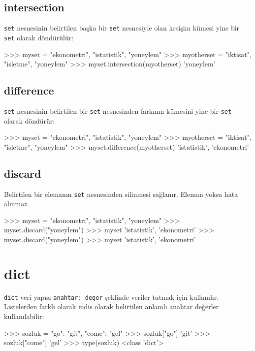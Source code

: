 \documentclass[12pt]{report}
\begin{document}
\subsection{intersection}
\texttt{set} nesnesinin belirtilen başka bir \texttt{set} nesnesiyle olan kesişim kümesi yine bir \texttt{set} olarak döndürülür:

\begin{python}
>>> myset = {"ekonometri", "istatistik", "yoneylem"}
>>> myotherset = {"iktisat", "isletme", "yoneylem"}
>>> myset.intersection(myotherset)
{'yoneylem'}
\end{python}


\subsection{difference}
\texttt{set} nesnesinin belirtilen bir \texttt{set} nesnesinden farkının kümesini yine bir \texttt{set} olarak döndürür:

\begin{python}
>>> myset = {"ekonometri", "istatistik", "yoneylem"}
>>> myotherset = {"iktisat", "isletme", "yoneylem"}
>>> myset.difference(myotherset)
{'istatistik', 'ekonometri'}
\end{python}

\subsection{discard}
Belirtilen bir elemanın \texttt{set} nesnesinden silinmesi sağlanır. Eleman yoksa hata alınmaz.

\begin{python}
>>> myset = {"ekonometri", "istatistik", "yoneylem"}
>>> myset.discard("yoneylem")
>>> myset
{'istatistik', 'ekonometri'}
>>> myset.discard("yoneylem")
>>> myset
{'istatistik', 'ekonometri'}
\end{python}



\section{dict}
\texttt{dict} veri yapısı \texttt{anahtar: deger} şeklinde veriler tutmak için kullanılır. Listelerden farklı olarak indis olarak belirtilen anlamlı anahtar değerler kullanılabilir:

\begin{python}
>>> sozluk = {"go": "git", "come": "gel"}
>>> sozluk["go"]
'git'
>>> sozluk["come"]
'gel'
>>> type(sozluk)
<class 'dict'>
\end{python}
\end{document}
